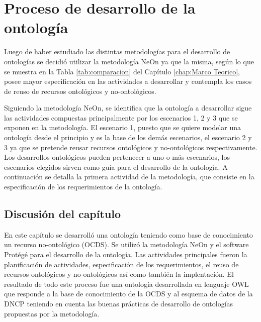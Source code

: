 \chapter{Proceso de desarrollo de la ontología}
\label{chap:Desarrollo de la Ontologia}

Luego de haber estudiado las distintas metodologías para el desarrollo de ontologías se decidió utilizar la metodología NeOn ya que la misma, según lo que se muestra en la Tabla  \ref{tab:comparacion} del Capítulo \ref{chap:Marco Teorico}, posee mayor especificación en las actividades a desarrollar  y contempla los casos de reuso de recursos ontológicos y no-ontológicos. 

Siguiendo la metodología NeOn, se identifica que la ontología a desarrollar sigue las actividades compuestas principalmente por los escenarios 1, 2 y 3 que se exponen en la metodología. El escenario 1, puesto que se quiere modelar una ontología desde el principio y es la base de los demás escenarios, el escenario 2 y 3 ya que se pretende reusar recursos ontológicos y no-ontológicos respectivamente. Los desarrollos ontológicos pueden pertenecer a uno o más escenarios, los escenarios elegidos sirven como guía para el desarrollo de la ontología. A continuación se detalla la primera actividad de la metodología, que consiste en la especificación de los requerimientos de la ontología.









\section{Discusión del capítulo}

En este capítulo se desarrolló una ontología teniendo como base de conocimiento un recurso no-ontológico (OCDS). Se utilizó la metodología NeOn y el software Protégé para el desarrollo de la ontología. Las actividades principales fueron la planificación de actividades, especificación de los requerimientos, el reuso de recursos ontológicos y no-ontológicos así como también la implentación. El resultado de todo este proceso fue una ontología desarrollada en lenguaje OWL que responde a la base de conocimiento de la OCDS y al esquema de datos de la DNCP teniendo en cuenta las buenas prácticas de desarrollo de ontologías propuestas por la metodología.





